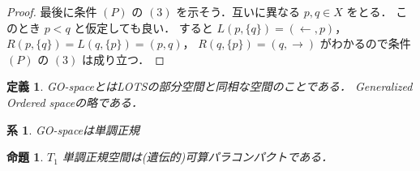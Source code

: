 \documentclass[leqno, 12pt]{ltjsarticle}
\newtheorem{prop}[thm]{命題}
\newtheorem{cor}[thm]{系}
\newtheorem{df}[thm]{定義}
\begin{document}
\begin{proof}
 最後に条件
 $(P)$
 の
 $(3)$
 を示そう．互いに異なる
 $p, q\in X$
 をとる．
 このとき
 $p<q$
 と仮定しても良い．
 すると
 $L(p, \{q\})=(\gets,p)$，
 $R(p, \{q\})=L(q, \{p\})=(p,q)$，
 $R(q,\{p\})=(q,\to)$
 がわかるので条件
 $(P)$
 の
 $(3)$
 は成り立つ．
\end{proof}

\begin{df}
GO-spaceとはLOTSの部分空間と同相な空間のことである．
Generalized Ordered spaceの略である．
\end{df}

\begin{cor}
GO-spaceは単調正規
\end{cor}



\begin{prop}
$T_{1}$
単調正規空間は(遺伝的)可算パラコンパクトである．
\end{prop}
\end{document}
